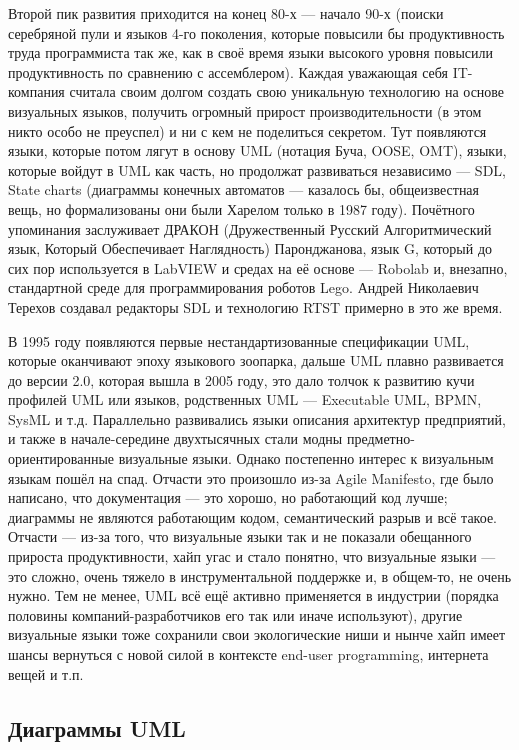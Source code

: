 \documentclass{../../text-style}
\begin{document}
Второй пик развития приходится на конец 80-х --- начало 90-х (поиски серебряной пули и языков 4-го поколения, которые повысили бы продуктивность труда программиста так же, как в своё время языки высокого уровня повысили продуктивность по сравнению с ассемблером). Каждая уважающая себя IT-компания считала своим долгом создать свою уникальную технологию на основе визуальных языков, получить огромный прирост производительности (в этом никто особо не преуспел) и ни с кем не поделиться секретом. Тут появляются языки, которые потом лягут в основу UML (нотация Буча, OOSE, OMT), языки, которые войдут в UML как часть, но продолжат развиваться независимо --- SDL, State charts (диаграммы конечных автоматов --- казалось бы, общеизвестная вещь, но формализованы они были Харелом только в 1987 году). Почётного упоминания заслуживает ДРАКОН (Дружественный Русский Алгоритмический язык, Который Обеспечивает Наглядность) Паронджанова, язык G, который до сих пор используется в LabVIEW и средах на её основе --- Robolab и, внезапно, стандартной среде для программирования роботов Lego. Андрей Николаевич Терехов создавал редакторы SDL и технологию RTST примерно в это же время.

В 1995 году появляются первые нестандартизованные спецификации UML, которые оканчивают эпоху языкового зоопарка, дальше UML плавно развивается до версии 2.0, которая вышла в 2005 году, это дало толчок к развитию кучи профилей UML или языков, родственных UML --- Executable UML, BPMN, SysML и т.д. Параллельно развивались языки описания архитектур предприятий, и также в начале-середине двухтысячных стали модны предметно-ориентированные визуальные языки. Однако постепенно интерес к визуальным языкам пошёл на спад. Отчасти это произошло из-за Agile Manifesto, где было написано, что документация --- это хорошо, но работающий код лучше; диаграммы не являются работающим кодом, семантический разрыв и всё такое. Отчасти --- из-за того, что визуальные языки так и не показали обещанного прироста продуктивности, хайп угас и стало понятно, что визуальные языки --- это сложно, очень тяжело в инструментальной поддержке и, в общем-то, не очень нужно. Тем не менее, UML всё ещё активно применяется в индустрии (порядка половины компаний-разработчиков его так или иначе используют), другие визуальные языки тоже сохранили свои экологические ниши и нынче хайп имеет шансы вернуться с новой силой в контексте end-user programming, интернета вещей и т.п.

\subsection{Диаграммы UML}
\end{document}
